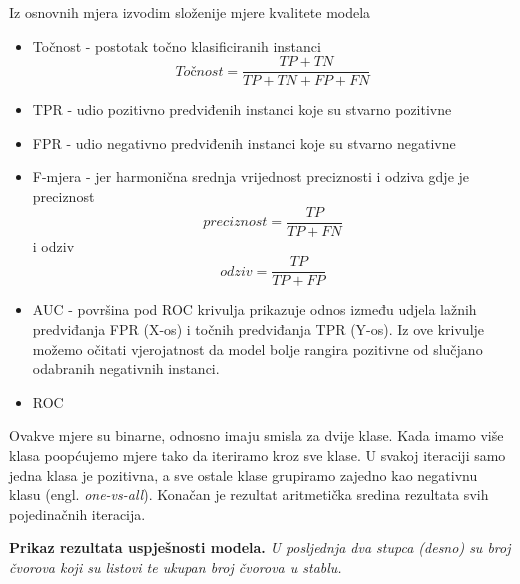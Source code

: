 Iz osnovnih mjera izvodim složenije mjere kvalitete modela
\begin{itemize}
   \item Točnost - postotak točno klasificiranih instanci 
   \begin{equation}
   Točnost = \frac{TP+TN}{TP+TN+FP+FN}
   \end{equation}
   \item TPR - udio pozitivno predviđenih instanci koje su stvarno pozitivne
   \item FPR - udio negativno predviđenih instanci koje su stvarno negativne
   \item F-mjera - jer harmonična srednja vrijednost preciznosti i odziva gdje je preciznost
   \begin{equation}
    preciznost = \frac{TP}{TP+FN}
   \end{equation}
   i odziv
   \begin{equation}
    odziv = \frac{TP}{TP+FP}
   \end{equation}
   \item AUC - površina pod ROC krivulja prikazuje odnos između udjela lažnih predviđanja FPR (X-os) i točnih predviđanja TPR (Y-os). Iz ove krivulje možemo očitati vjerojatnost da model bolje rangira pozitivne od slučjano odabranih negativnih instanci.
   \item ROC
\end{itemize}

Ovakve mjere su binarne, odnosno imaju smisla za dvije klase. Kada imamo više klasa poopćujemo mjere tako da iteriramo kroz sve klase. U svakoj iteraciji samo jedna klasa je pozitivna, a sve ostale klase grupiramo zajedno kao negativnu klasu (engl. \textit{one-vs-all}). Konačan je rezultat aritmetička sredina rezultata svih pojedinačnih iteracija.

\begin{table}[!ht]
    \centering
    \caption[Prikaz rezultata uspješnosti modela]{\textbf{Prikaz rezultata uspješnosti modela.} \textit{U posljednja dva stupca (desno) su broj čvorova koji su listovi te ukupan broj čvorova u stablu.}}
    \label{tab:mjera}
\end{table}

